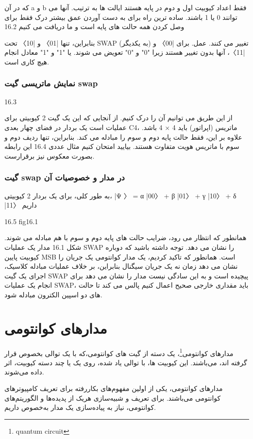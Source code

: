 \documentclass{book}
\begin{document}
که در آن a و b فقط اعداد کیوبیت اول و دوم در پایه هستند
ایالت ها به ترتیب. آنها می توانند 0 یا 1 باشند. ساده ترین راه برای به دست آوردن عمق بیشتر
درک فقط برای وصل کردن همه حالت های پایه است و ما دریافت می کنیم
16.2


بنابراین، تنها |01〉 و |10〉 تحت SWAP (به یکدیگر) تغییر می کنند.
عمل. برای |00〉 و |11〉، آنها بدون تغییر هستند زیرا "0" و "0" تعویض می شوند.
یا "1" و "1" معادل انجام هیچ کاری است.


\subsubsection{نمایش ماتریسی گیت swap}
16.3

از این طریق می توانیم آن را درک کنیم. از آنجایی که این یک گیت 2 کیوبیتی برای عملیات است
یک بردار در فضای چهار بعدی C4، ماتریس (اپراتور) باید 4 × 4 باشد.
علاوه بر این، فقط حالت پایه دوم و سوم را مبادله می کند. بنابراین، تنها
ردیف دوم و سوم با ماتریس هویت متفاوت هستند. بیایید امتحان کنیم
مثال عددی
16.4
این رابطه‌ بصورت معکوس نیز برقرارست.
\subsubsection{گیت swap در مدار و خصوصیات آن}
به طور کلی، برای یک بردار 2 کیوبیتی، |Ψ 〉 = α |00〉 + β |01〉 + γ |10〉 + δ |11〉 داریم

16.5
fig16.1

همانطور که انتظار می رود، ضرایب حالت های پایه دوم و سوم با هم مبادله می شوند.
شکل 16.1 مدار یک عملیات SWAP را نشان می دهد. توجه داشته باشید که دوباره کیوبیت پایین
MSB است. همانطور که تاکید کردیم، یک مدار کوانتومی یک جریان را نشان می دهد
زمان نه یک جریان سیگنال بنابراین، بر خلاف عملیات مبادله کلاسیک،
اجرای یک گیت SWAP پیچیده است و به این سادگی نیست
مدار را نشان می دهد برای انجام یک عملیات SWAP، باید مقداری خارجی صحیح اعمال کنیم
پالس می کند تا حالت های دو اسپین الکترون مبادله شود.









\section{مدار‌های کوانتومی}
مدار‌های ‌کوانتومی\footnote{quantum circuit}، یک دسته از گیت ها‌ی کوانتومی،که با یک توالی بخصوص قرار گرفته اند، ‌می‌باشند. این کیوبیت ها، با توالی یاد شده، روی یک یا چند دسته کیوبیت، اثر داده ‌می‌شوند. 

مدار‌های کوانتومی، یکی از اولین مفهوم‌های بکار‌رفته برای تعریف کامپیوتر‌های کوانتومی‌ می‌باشند. برای تعریف و شبیه‌سازی هریک از پدیده‌ها و الگوریتم‌های کوانتومی، نیاز به پیاده‌سازی یک مدار به‌خصوص داریم.
\end{document}
